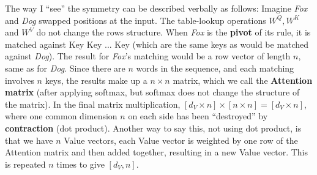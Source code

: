 The way I ``see'' the symmetry can be described verbally as follows:  Imagine \textit{Fox} and \textit{Dog} swapped positions at the input.  The table-lookup operations $W^Q, W^K$ and $W^V$ do not change the rows structure.  When \textit{Fox} is the \textbf{pivot} of its rule, it is matched against Key Key ... Key (which are the same keys as would be matched against \textit{Dog}).  The result for \textit{Fox}'s matching would be a row vector of length $n$, same as for \textit{Dog}.  Since there are $n$ words in the sequence, and each matching involves $n$ keys, the results make up a $n \times n$ matrix, which we call the \textbf{Attention matrix} (after applying softmax, but softmax does not change the structure of the matrix).  In the final matrix multiplication, $[d_V \times n] \times [n \times n] = [d_V \times n]$, where one common dimension $n$ on each side has been ``destroyed'' by \textbf{contraction} (dot product).  Another way to say this, not using dot product, is that we have $n$ Value vectors, each Value vector is weighted by one row of the Attention matrix and then added together, resulting in a new Value vector.  This is repeated $n$ times to give $[d_V, n]$.

